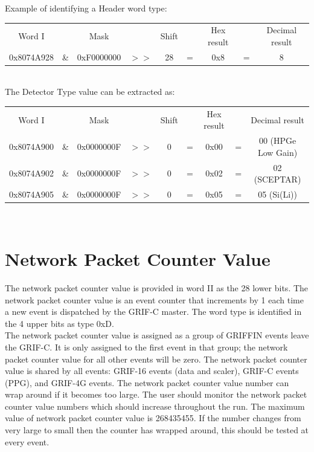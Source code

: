 \documentclass[letterpaper,12pt,notitlepage]{report}
\begin{document}
Example of identifying a Header word type:\\

\begin{tabular}{ccccccccc}
Word I &  & Mask & & Shift & & Hex result & & Decimal result\\
0x8074A928 & \& & 0xF0000000 & $>>$ & 28 & = & 0x8 & = & 8\\
\end{tabular}\\

 The Detector Type value can be extracted as:\\

\begin{tabular}{ccccccccc}
Word I &  & Mask & & Shift & & Hex result & & Decimal result\\
0x8074A900 & \& & 0x0000000F & $>>$ & 0 & = & 0x00 & = & 00 (HPGe Low Gain)\\
0x8074A902 & \& & 0x0000000F & $>>$ & 0 & = & 0x02 & = & 02 (SCEPTAR)\\
0x8074A905 & \& & 0x0000000F & $>>$ & 0 & = & 0x05 & = & 05 (Si(Li))\\
\end{tabular}\\

\section{Network Packet Counter Value}
The network packet counter value is provided in word II as the 28 lower bits. The network packet counter value is an event counter that increments by 1 each time a new event is dispatched by the GRIF-C master. The word type is identified in the 4 upper bits as type 0xD.\\
The network packet counter value is assigned as a group of GRIFFIN events leave the GRIF-C. It is only assigned to the first event in that group; the network packet counter value for all other events will be zero. The network packet counter value is shared by all events: GRIF-16 events (data and scaler), GRIF-C events (PPG), and GRIF-4G events. The network packet counter value number can wrap around if it becomes too large. The user should monitor the network packet counter value numbers which should increase throughout the run. The maximum value of network packet counter value is 268435455. If the number changes from very large to small then the counter has wrapped around, this should be tested at every event.\\
\end{document}
